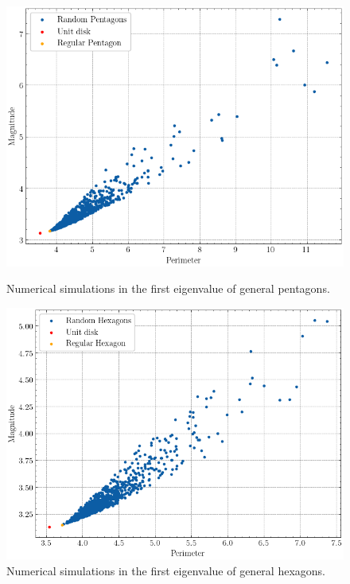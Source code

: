 \begin{figure}[!htb]
    \centering
    \begin{minipage}[b]{0.45\textwidth}
        \centering
        \includegraphics[width=\textwidth]{Images/Dirac/Polygons/pentagons.png}
    \caption{Numerical simulations in the first eigenvalue of general pentagons.}
    \label{dirac_polya_szego_evidence_pentagons}
    \end{minipage}
    \hfill
    \begin{minipage}[b]{0.45\textwidth}
        \centering
        \includegraphics[width=\textwidth]{Images/Dirac/Polygons/hexagons.png}
    \caption{Numerical simulations in the first eigenvalue of general hexagons.}
    \label{dirac_polya_szego_evidence_hexagons}
    \end{minipage}


\end{figure}
